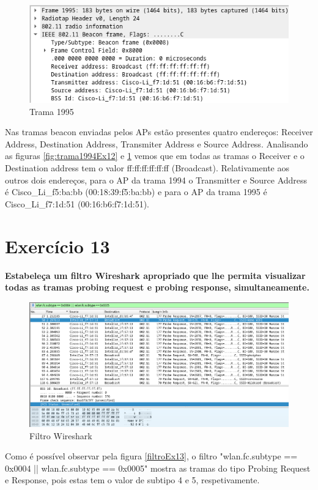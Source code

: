 \documentclass[a4paper]{report}
\begin{document}
\begin{figure}[H]
    \centering
    \includegraphics[width=\textwidth]{images/trama1995Ex12.png}  
    \caption{Trama 1995}
    \label{fig:trama1995Ex12}
\end{figure}
Nas tramas beacon enviadas pelos APs estão presentes quatro endereços: Receiver
Address, Destination Address, Transmiter Address e Source Address. Analisando
as figuras \ref{fig:trama1994Ex12} e \ref{fig:trama1995Ex12} vemos que em todas as
tramas o Receiver e o Destination address tem o valor ff:ff:ff:ff:ff:ff
(Broadcast). Relativamente aos outros dois endereços, para o AP da trama 1994 
o Transmitter e Source Address é Cisco\_Li\_f5:ba:bb (00:18:39:f5:ba:bb) e para
o AP da trama 1995 é Cisco\_Li\_f7:1d:51 (00:16:b6:f7:1d:51).

\section{Exercício 13}
\textbf{Estabeleça um filtro Wireshark apropriado que lhe permita visualizar
todas as tramas probing request e probing response, simultaneamente.}

\begin{figure}[H]
    \centering 
    \includegraphics[width=\textwidth]{images/filtroEx13.png}  
    \caption{Filtro Wireshark}
    \label{fig:filtroEx3}
\end{figure}
Como é possível observar pela figura \ref{filtroEx13}, o filtro "wlan.fc.subtype 
== 0x0004 || wlan.fc.subtype == 0x0005" mostra as tramas do tipo Probing Request
e Response, pois estas tem o valor de subtipo 4 e 5, respetivamente.
\end{document}

